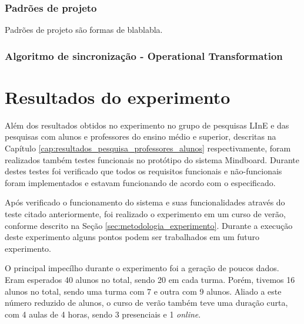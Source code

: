 



\subsection{Padrões de projeto}
\label{sec:padroes_projeto}

Padrões de projeto são formas de blablabla.


\subsection{Algoritmo de sincronização - Operational Transformation}
\label{sec:alg_ot}





\chapter{Resultados do experimento}
\label{cap:resultados}

Além dos resultados obtidos no experimento no grupo de pesquisas LInE e das pesquisas com alunos e professores do ensino médio e superior, descritas na Capítulo \ref{cap:resultados_pesquisa_professores_alunos} respectivamente, foram realizados também testes funcionais no protótipo do sistema Mindboard. Durante destes testes foi verificado que todos os requisitos funcionais e não-funcionais foram implementados e estavam funcionando de acordo com o especificado. 

Após verificado o funcionamento do sistema e suas funcionalidades através do teste citado anteriormente, foi realizado o experimento em um curso de verão, conforme descrito na Seção \ref{sec:metodologia_experimento}. Durante a execução deste experimento alguns pontos podem ser trabalhados em um futuro experimento. 

O principal impecílho durante o experimento foi a geração de poucos dados. Eram esperados 40 alunos no total, sendo 20 em cada turma. Porém, tivemos 16 alunos no total, sendo uma turma com 7 e outra com 9 alunos. Aliado a este número reduzido de alunos, o curso de verão também teve uma duração curta, com 4 aulas de 4 horas, sendo 3 presenciais e 1 \emph{online}.

